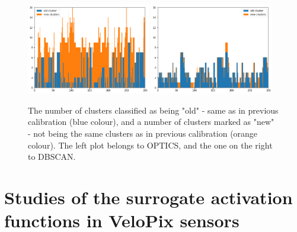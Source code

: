 \begin{figure}[H]
\centering
\includegraphics[width=0.48\textwidth]{figures/chapter4/velopix_clusters/optics_progress.png}
\includegraphics[width=0.48\textwidth]{figures/chapter4/velopix_clusters/dbscan_progress.png}
\caption{ The number of clusters classified as being "old" - same as in previous calibration (blue colour), and a number of clusters marked as "new" - not being the same clusters as in previous calibration (orange colour). The left plot belongs to OPTICS, and the one on the right to DBSCAN.
}
\label{fig:progress}
\end{figure}

\section{Studies of the surrogate activation functions in VeloPix sensors}
\label{sec:surrogates-study}

